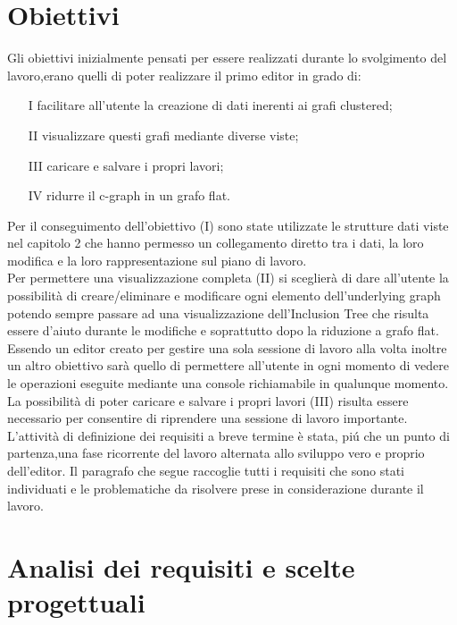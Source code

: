 {\section{Obiettivi}
Gli obiettivi inizialmente pensati per essere realizzati durante lo svolgimento del lavoro,erano quelli di poter realizzare il primo editor in grado di:
\begin{itemize}
	\item[I]facilitare all'utente la creazione di dati inerenti ai grafi clustered;
	\item[II] visualizzare questi grafi mediante diverse viste;
	\item[III]caricare e salvare i propri lavori;
	\item[IV] ridurre il c-graph in un grafo flat.
\end{itemize}
Per il conseguimento dell'obiettivo (I) sono state utilizzate le strutture dati viste nel capitolo 2 che hanno permesso un collegamento diretto tra i dati, la loro modifica e la loro rappresentazione sul piano di lavoro.\\
Per permettere una visualizzazione completa (II) si sceglierà di dare all'utente la possibilità di creare/eliminare e modificare ogni elemento dell'underlying graph potendo sempre passare ad una visualizzazione dell'Inclusion Tree che risulta essere d'aiuto durante le modifiche e soprattutto dopo la riduzione a grafo flat. Essendo un editor creato per gestire una sola sessione di lavoro alla volta inoltre un altro obiettivo sarà quello di permettere all'utente in ogni momento di vedere le operazioni eseguite mediante una console richiamabile in qualunque momento.\\
La possibilità di poter caricare e salvare i propri lavori (III) risulta essere necessario per consentire di riprendere una sessione di lavoro importante.\\
L’attività di definizione dei requisiti a breve termine \`e stata, pi\'u che un punto di partenza,una fase ricorrente del lavoro alternata allo sviluppo vero e proprio dell'editor. Il paragrafo che segue raccoglie tutti i requisiti che sono stati individuati e le problematiche da risolvere prese in considerazione durante il lavoro.

\section{Analisi dei requisiti e scelte progettuali}

}
